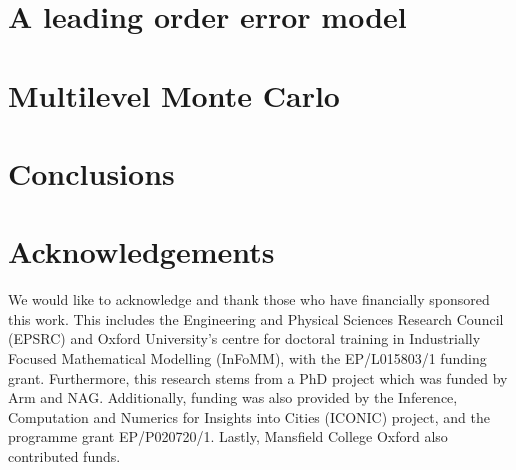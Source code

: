 \documentclass[manuscript,review,demo]{acmart}
\begin{document}
\section{A leading order error model}
\label{sec:a_leading_order_error_model}

\section{Multilevel Monte Carlo}
\label{sec:multilevel_monte_carlo}

\section{Conclusions}
\label{sec:conclusions}

\section{Acknowledgements}
\label{sec:acknowledgements}

We would like to acknowledge and thank those who have financially sponsored this work. This includes the Engineering and Physical Sciences Research Council (EPSRC) and Oxford University's centre for doctoral training in Industrially Focused Mathematical Modelling (InFoMM), with the EP/L015803/1 funding grant. Furthermore, this research stems from a PhD project \citep{sheridan2020nested} which was funded by Arm and NAG. Additionally, funding was also provided by the Inference, Computation and Numerics for Insights into Cities (ICONIC) project, and the programme grant EP/P020720/1. Lastly, Mansfield College Oxford also contributed funds.  



\end{document}
